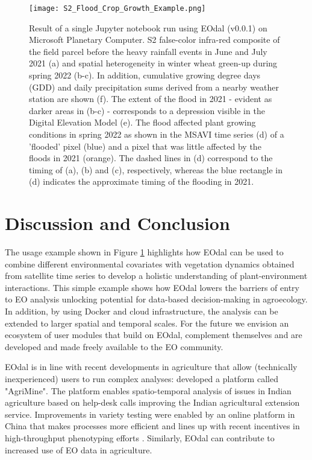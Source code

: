 \begin{figure}[H]
    \centering
    \texttt{[image: S2\_Flood\_Crop\_Growth\_Example.png]}
    \caption{Result of a single Jupyter notebook run using \gls{EOdal} (v0.0.1) on Microsoft Planetary Computer. \gls{S2} false-color infra-red composite of the field parcel before the heavy rainfall events in June and July 2021 (a) and spatial heterogeneity in winter wheat green-up during spring 2022 (b-c). In addition, cumulative growing degree days (GDD) and daily precipitation sums derived from a nearby weather station are shown (f). The extent of the flood in 2021 - evident as darker areas in (b-c) - corresponds to a depression visible in the Digital Elevation Model (e). The flood affected plant growing conditions in spring 2022 as shown in the MSAVI time series (d) of a 'flooded' pixel (blue) and a pixel that was little affected by the floods in 2021 (orange). The dashed lines in (d) correspond to the timing of (a), (b) and (c), respectively, whereas the blue rectangle in (d) indicates the approximate timing of the flooding in 2021.}
    \label{fig:s2-fig}
\end{figure}

\section{Discussion and Conclusion}
\label{sec:eodal_conclusions}
%
The usage example shown in Figure \ref{fig:s2-fig} highlights how \gls{EOdal} can be used to combine different environmental covariates with vegetation dynamics obtained from satellite time series to develop a holistic understanding of plant-environment interactions. This simple example shows how \gls{EOdal} lowers the barriers of entry to \gls{EO} analysis unlocking potential for data-based decision-making in agroecology. In addition, by using Docker and cloud infrastructure, the analysis can be extended to larger spatial and temporal scales. For the future we envision an ecosystem of user modules that build on EOdal, complement themselves and are developed and made freely available to the \gls{EO} community. 

\gls{EOdal} is in line with recent developments in agriculture that allow (technically inexperienced) users to run complex analyses: \citet{godara_agrimine_2022} developed a platform called "AgriMine". The platform enables spatio-temporal analysis of issues in Indian agriculture based on help-desk calls improving the Indian agricultural extension service. Improvements in variety testing were enabled by an online platform in China that makes processes more efficient and lines up with recent incentives in high-throughput phenotyping efforts \citep{pan_online_2022}. Similarly, \gls{EOdal} can contribute to increased use of EO data in agriculture.

